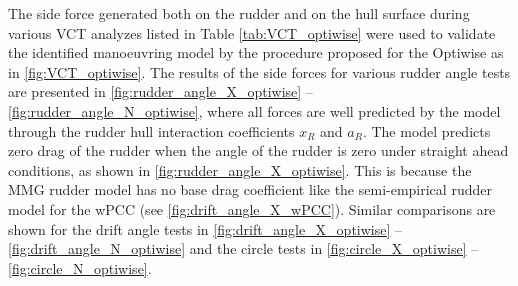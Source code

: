 The side force generated both on the rudder and on the hull surface during various VCT analyzes listed in Table \ref{tab:VCT_optiwise} were used to validate the identified manoeuvring model by the procedure proposed for the Optiwise as in \autoref{fig:VCT_optiwise}. The results of the side forces for various rudder angle tests are presented in \autoref{fig:rudder_angle_X_optiwise} -- \autoref{fig:rudder_angle_N_optiwise}, where all forces are well predicted by the model through the rudder hull interaction coefficients $x_R$ and $a_R$. 
The model predicts zero drag of the rudder when the angle of the rudder is zero under straight ahead conditions, as shown in \autoref{fig:rudder_angle_X_optiwise}. This is because the MMG rudder model has no base drag coefficient like the semi-empirical rudder model for the wPCC (see \autoref{fig:drift_angle_X_wPCC}).
Similar comparisons are shown for the drift angle tests in \autoref{fig:drift_angle_X_optiwise} -- \autoref{fig:drift_angle_N_optiwise} and the circle tests in \autoref{fig:circle_X_optiwise} -- \autoref{fig:circle_N_optiwise}. 
